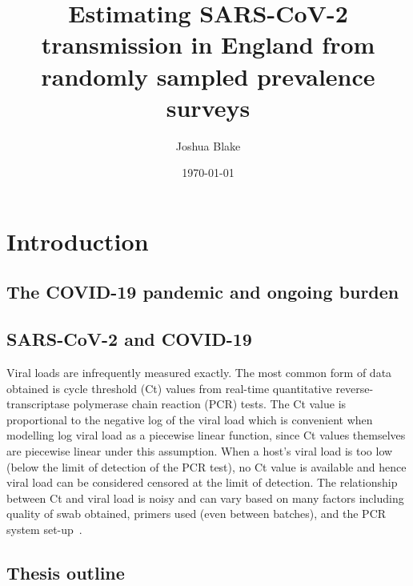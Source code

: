 \documentclass{cam-thesis}
\title{Estimating SARS-CoV-2 transmission in England from randomly sampled prevalence surveys}
\author{Joshua Blake}
\date{\today}
\makeatletter
\DeclareRobustCommand\onedot{\futurelet\@let@token\@onedot}
\def\@onedot{\ifx\@let@token.\else.\null\fi\xspace}
\def\ie{i.e\onedot} \def\Ie{\emph{I.e}\onedot}
\makeatother
\begin{document}
\frontmatter{}

\listoffigures

\chapter{Introduction} \label{intro}

\section{The COVID-19 pandemic and ongoing burden}

\section{SARS-CoV-2 and COVID-19}

Viral loads are infrequently measured exactly.
The most common form of data obtained is cycle threshold (Ct) values from real-time quantitative  reverse-transcriptase polymerase chain reaction (PCR) tests.
The Ct value is proportional to the negative log of the viral load which is convenient when modelling log viral load as a piecewise linear function, since Ct values themselves are piecewise linear under this assumption.
When a host's viral load is too low (below the limit of detection of the PCR test), no Ct value is available and hence viral load can be considered censored at the limit of detection.
The relationship between Ct and viral load is noisy and can vary based on many factors including quality of swab obtained, primers used (even between batches), and the PCR system set-up~\autocites{dahdouhCt,hanRTPCR}.

\section{Thesis outline}






\end{document}
